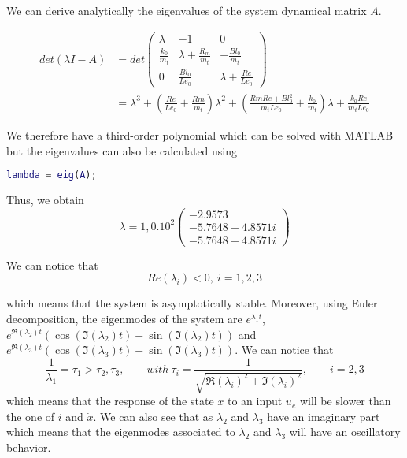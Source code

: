We can derive analytically the eigenvalues of the system dynamical matrix $A$.

\begin{align}
	\label{eq:eigenValues}
	det(\lambda I-A) & =det\begin{pmatrix}
 \lambda & -1 & 0 \\
  \frac{k_0}{m_t} & \lambda+\frac{R_m}{m_t} & -\frac{Bl_0}{m_t} \\
  0 & \frac{Bl_0}{Le_0} & \lambda+\frac{Re}{Le_0}
\end{pmatrix} \\
& = \lambda^3 +\left(\frac{Re}{Le_0}+\frac{Rm}{m_t}\right)\lambda^2+\left(\frac{RmRe+Bl_0^2}{m_tLe_0}+\frac{k_0}{m_t}\right)\lambda+\frac{k_0Re}{m_tLe_0}
\end{align}

We therefore have a third-order polynomial which can be solved with MATLAB but the eigenvalues can also be calculated using
\begin{lstlisting}[language=Matlab]
lambda = eig(A);
\end{lstlisting}

Thus, we obtain
\begin{equation}
	\label{eq:eigenValuesValues}
	\lambda = 1,0.10^2\begin{pmatrix}
	-2.9573 \\
	-5.7648 + 4.8571i\\
	-5.7648 - 4.8571i
	\end{pmatrix}
\end{equation}

We can notice that
\begin{equation}
	\label{eq:eigenValuesRe}
	Re(\lambda_i)<0, \ i=1,2,3
\end{equation}

which means that the system is asymptotically stable. Moreover, using Euler decomposition, the eigenmodes of the system are $e^{\lambda_1t}$, $e^{\Re(\lambda_2)t}\left(\cos(\Im(\lambda_2)t)+\sin(\Im(\lambda_2)t)\right)$ and $e^{\Re(\lambda_3)t}\left(\cos(\Im(\lambda_3)t)-\sin(\Im(\lambda_3)t)\right)$. We can notice that \begin{equation*}
\frac{1}{\lambda_1}=\tau_1>\tau_2, \tau_3, \qquad with\ \tau_i = \frac{1}{\sqrt{\Re(\lambda_i)^2+\Im(\lambda_i)^2}}, \qquad i = 2, 3
\end{equation*}
which means that the response of the state $x$ to an input $u_e$ will be slower than the one of $i$ and $\dot{x}$. We can also see that as $\lambda_2$ and $\lambda_3$ have an imaginary part which means that the eigenmodes associated to $\lambda_2$ and $\lambda_3$ will have an oscillatory behavior.
